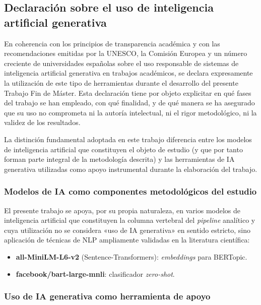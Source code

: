 
\clearpage
\subsection*{Declaración sobre el uso de inteligencia artificial generativa}

En coherencia con los principios de transparencia académica y con las recomendaciones emitidas por la UNESCO, la Comisión Europea y un número creciente de universidades españolas sobre el uso responsable de sistemas de inteligencia artificial generativa en trabajos académicos, se declara expresamente la utilización de este tipo de herramientas durante el desarrollo del presente Trabajo Fin de Máster. Esta declaración tiene por objeto explicitar en qué fases del trabajo se han empleado, con qué finalidad, y de qué manera se ha asegurado que su uso no comprometa ni la autoría intelectual, ni el rigor metodológico, ni la validez de los resultados.

La distinción fundamental adoptada en este trabajo diferencia entre los modelos de inteligencia artificial que constituyen el objeto de estudio (y que por tanto forman parte integral de la metodología descrita) y las herramientas de IA generativa utilizadas como apoyo instrumental durante la elaboración del trabajo.

\subsubsection*{Modelos de IA como componentes metodológicos del estudio}

El presente trabajo se apoya, por su propia naturaleza, en varios modelos de inteligencia artificial que constituyen la columna vertebral del \textit{pipeline} analítico y cuya utilización no se considera «uso de IA generativa» en sentido estricto, sino aplicación de técnicas de NLP ampliamente validadas en la literatura científica:

\begin{itemize}
    \item \textbf{all-MiniLM-L6-v2} (Sentence-Transformers): \textit{embeddings} para BERTopic.
    \item \textbf{facebook/bart-large-mnli}: clasificador \textit{zero-shot}.
\end{itemize}

\subsubsection*{Uso de IA generativa como herramienta de apoyo}

